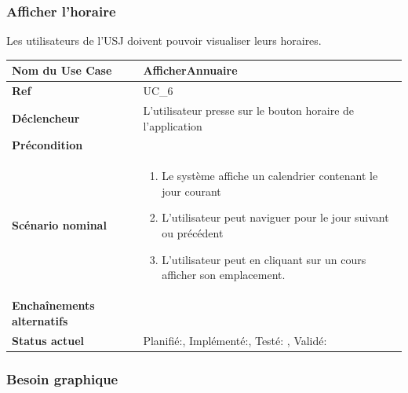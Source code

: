 

			\subsubsection{Afficher l'horaire}
								Les utilisateurs de l'USJ  doivent pouvoir visualiser leurs horaires.\\[0.2cm]
								\begin{longtable}{|l|p{10cm}|}
									\hline \textbf{Nom du Use Case} & AfficherAnnuaire \\ 
									\hline \textbf{Ref} & UC\_6  \\ 
									\hline \textbf{Déclencheur} & L'utilisateur presse sur le bouton horaire  de l'application \\
									\hline \textbf{Précondition} &  \\
									\hline \textbf{Scénario nominal} & 
									\begin{enumerate}
										\item Le système affiche un calendrier contenant le jour courant 
										\item L'utilisateur peut naviguer pour le jour suivant ou précédent 
										\item L'utilisateur peut en cliquant sur un cours afficher son emplacement.
									\end{enumerate}
									\\ 
									\hline \textbf{Enchaînements alternatifs} & \\
									\hline \textbf{Status actuel} & Planifié:\CheckedBox , Implémenté:\CheckedBox  , Testé: \CheckedBox  , Validé: \CheckedBox	  \\
									\hline 
								\end{longtable} 
						\subsubsection*{Besoin graphique}
			
								


